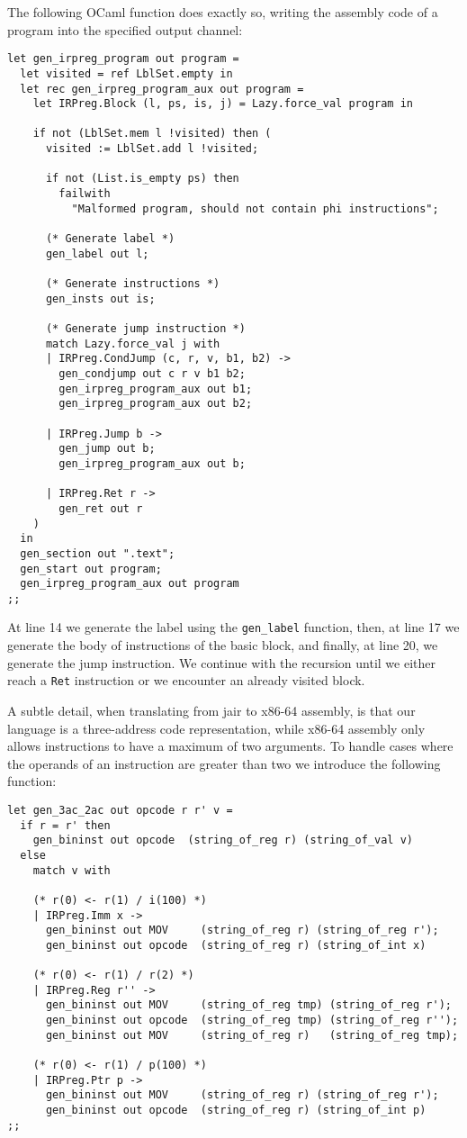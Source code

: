 The following OCaml function does exactly so, writing the assembly code of a program into the specified output channel:

\begin{lstlisting}[style=OCaml]
let gen_irpreg_program out program =
  let visited = ref LblSet.empty in
  let rec gen_irpreg_program_aux out program =
    let IRPreg.Block (l, ps, is, j) = Lazy.force_val program in

    if not (LblSet.mem l !visited) then (
      visited := LblSet.add l !visited;

      if not (List.is_empty ps) then
        failwith
          "Malformed program, should not contain phi instructions";

      (* Generate label *)
      gen_label out l;

      (* Generate instructions *)
      gen_insts out is;

      (* Generate jump instruction *)
      match Lazy.force_val j with
      | IRPreg.CondJump (c, r, v, b1, b2) ->
        gen_condjump out c r v b1 b2;
        gen_irpreg_program_aux out b1;
        gen_irpreg_program_aux out b2;

      | IRPreg.Jump b ->
        gen_jump out b;
        gen_irpreg_program_aux out b;

      | IRPreg.Ret r ->
        gen_ret out r
    )
  in
  gen_section out ".text";
  gen_start out program;
  gen_irpreg_program_aux out program
;;
\end{lstlisting}

At line 14 we generate the label using the \texttt{gen\_label} function, then, at line 17 we generate the body of instructions of the basic block, and finally, at line 20, we generate the jump instruction. We continue with the recursion until we either reach a \texttt{Ret} instruction or we encounter an already visited block.

A subtle detail, when translating from \gls{jair} to x86-64 assembly, is that our language is a three-address code representation, while x86-64 assembly only allows instructions to have a maximum of two arguments.
To handle cases where the operands of an instruction are greater than two we introduce the following function:

\begin{lstlisting}[style=OCaml]
let gen_3ac_2ac out opcode r r' v =
  if r = r' then
    gen_bininst out opcode  (string_of_reg r) (string_of_val v)
  else
    match v with

    (* r(0) <- r(1) / i(100) *)
    | IRPreg.Imm x ->
      gen_bininst out MOV     (string_of_reg r) (string_of_reg r');
      gen_bininst out opcode  (string_of_reg r) (string_of_int x)

    (* r(0) <- r(1) / r(2) *)
    | IRPreg.Reg r'' ->
      gen_bininst out MOV     (string_of_reg tmp) (string_of_reg r');
      gen_bininst out opcode  (string_of_reg tmp) (string_of_reg r'');
      gen_bininst out MOV     (string_of_reg r)   (string_of_reg tmp);

    (* r(0) <- r(1) / p(100) *)
    | IRPreg.Ptr p ->
      gen_bininst out MOV     (string_of_reg r) (string_of_reg r');
      gen_bininst out opcode  (string_of_reg r) (string_of_int p)
;;
\end{lstlisting}

